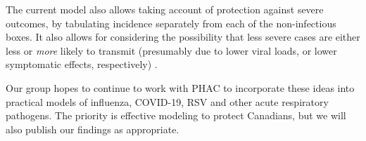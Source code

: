 The current model also allows taking account of protection against severe outcomes, by tabulating incidence separately from each of the non-infectious boxes. It also allows for considering the possibility that less severe cases are either less or \emph{more} likely to transmit (presumably due to lower viral loads, or lower symptomatic effects, respectively) \cite{ParisPaper}.


Our group hopes to continue to work with PHAC to incorporate these ideas into practical models of influenza, COVID-19, RSV and other acute respiratory pathogens. The priority is effective modeling to protect Canadians, but we will also publish our findings as appropriate.
